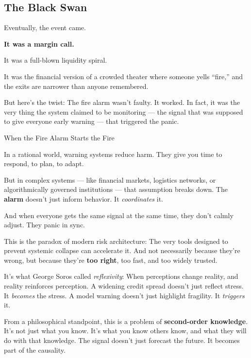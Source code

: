 \subsection{The Black Swan}

Eventually, the event came.

\textbf{It was a margin call.}

It was a full-blown liquidity spiral. 

It was the financial version of a crowded theater where someone yells ``fire,'' and the 
exits are narrower than anyone remembered.

But here’s the twist:
The fire alarm wasn’t faulty. 
It worked.
In fact, it was the very thing the system claimed to be monitoring — the signal that was supposed to give everyone early 
warning — that triggered the panic.

  \medskip

\begin{PhilosophicalSidebar}{When the Fire Alarm Starts the Fire}

  In a rational world, warning systems reduce harm.  
  They give you time to respond, to plan, to adapt.

  \medskip
  
  But in complex systems — like financial markets, logistics networks, or algorithmically governed institutions — 
  that assumption breaks down.  
  The \textbf{alarm} doesn’t just inform behavior.  
  It \textit{coordinates} it.
  
  \medskip
  
  And when everyone gets the same signal at the same time, they don’t calmly adjust.  
  They panic in sync.
  
  \medskip
  
  This is the paradox of modern risk architecture:  
  The very tools designed to prevent systemic collapse can accelerate it. And not necessarily because they’re 
  wrong, but because they’re \textbf{too right}, too fast, and too widely trusted.

  \medskip
  
  
  It’s what George Soros called \textit{reflexivity}:  
  When perceptions change reality, and reality reinforces perception.  
  A widening credit spread doesn’t just reflect stress. It \textit{becomes} the stress.  
  A model warning doesn’t just highlight fragility. It \textit{triggers} it.
  
  \medskip
  
  From a philosophical standpoint, this is a problem of \textbf{second-order knowledge}.  
  It’s not just what you know. It’s what you know others know, and what they will do with that knowledge.  
  The signal doesn’t just forecast the future. It becomes part of the causality.
  
\end{PhilosophicalSidebar}

